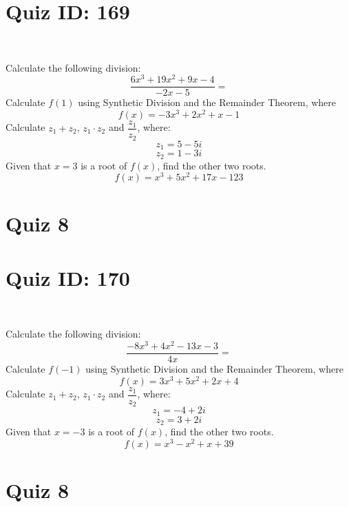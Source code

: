 \documentclass{exam}
\begin{document}
\section*{Quiz ID: 169}
\vspace{0.5cm}\
\vspace{1cm}\
\begin{questions}
\question Calculate the following division:\[\dfrac{
6x^3 + 19x^2 + 9x - 4}{
-2x - 5}=\] \makeemptybox{\stretch{2}}
\question Calculate $f(1)$ using Synthetic Division and the Remainder Theorem, where\[f(x) = 
-3x^3 + 2x^2 + x - 1\]
\newpage\question Calculate $z_1+z_2$, $z_1\cdot z_2$ and $\dfrac{z_1}{z_2}$, where:\[z_1=5-5\mathit{i}\]\[z_2=1-3\mathit{i}\]
\question Given that $x=3$ is a root of $f(x)$, find the other two roots.\[f(x)=
x^3 + 5x^2 + 17x - 123\]\makeemptybox{\stretch{1}}
\end{questions}\newpage
\newpage
\section*{Quiz 8}
\section*{Quiz ID: 170}
\vspace{0.5cm}\
\vspace{1cm}\
\begin{questions}
\question Calculate the following division:\[\dfrac{
-8x^3 + 4x^2 - 13x - 3}{
4x}=\] 
\question Calculate $f(-1)$ using Synthetic Division and the Remainder Theorem, where\[f(x) = 
3x^3 + 5x^2 + 2x + 4\]
\newpage\question Calculate $z_1+z_2$, $z_1\cdot z_2$ and $\dfrac{z_1}{z_2}$, where:\[z_1=-4+2\mathit{i}\]\[z_2=3+2\mathit{i}\]\makeemptybox{\stretch{1}}
\question Given that $x=-3$ is a root of $f(x)$, find the other two roots.\[f(x)=
x^3 - x^2 + x + 39\]\makeemptybox{\stretch{1}}
\end{questions}\newpage
\newpage
\section*{Quiz 8}
\end{document}
